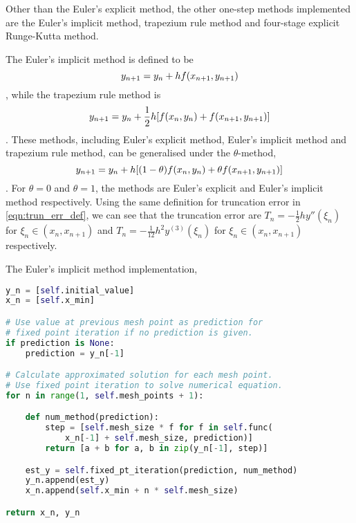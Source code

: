 Other than the Euler's explicit method, the other one-step methods implemented are the Euler's implicit method, trapezium rule method and four-stage explicit Runge-Kutta method.

The Euler's implicit method is defined to be
\begin{equation}
    y_{n+1} = y_n + hf(x_{n+1},y_{n+1})\\
\end{equation}
, while the trapezium rule method is
\begin{equation}
    y_{n+1} = y_n + \frac{1}{2}h[f(x_n,y_n) + f(x_{n+1},y_{n+1})]\\
\end{equation}
. These methods, including Euler's explicit method, Euler's implicit method and trapezium rule method, can be generalised under the $\theta$-method,
\begin{equation}
    y_{n+1} = y_n + h[(1-\theta)f(x_n,y_n) + \theta f(x_{n+1},y_{n+1})]\\
\end{equation}
. For $\theta = 0$ and $\theta = 1$, the methods are Euler's explicit and Euler's implicit method respectively. Using the same definition for truncation error in \ref{eqn:trun_err_def}, we can see that the truncation error are $T_n = -\frac{1}{2}hy''(\xi_n)$ for $\xi_n \in (x_n, x_{n+1})$ and $T_n = -\frac{1}{12}h^2y^{(3)}(\xi_n)$ for $\xi_n \in (x_n, x_{n+1})$ respectively.

The Euler's implicit method implementation,
\begin{lstlisting}[language=Python]
y_n = [self.initial_value]
x_n = [self.x_min]

# Use value at previous mesh point as prediction for
# fixed point iteration if no prediction is given.
if prediction is None:
    prediction = y_n[-1]

# Calculate approximated solution for each mesh point.
# Use fixed point iteration to solve numerical equation.
for n in range(1, self.mesh_points + 1):

    def num_method(prediction):
        step = [self.mesh_size * f for f in self.func(
            x_n[-1] + self.mesh_size, prediction)]
        return [a + b for a, b in zip(y_n[-1], step)]

    est_y = self.fixed_pt_iteration(prediction, num_method)
    y_n.append(est_y)
    x_n.append(self.x_min + n * self.mesh_size)

return x_n, y_n
\end{lstlisting}

